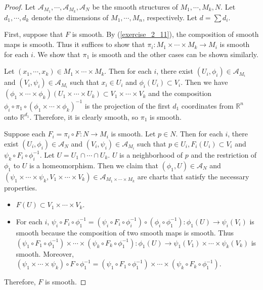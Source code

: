 \begin{proof}
  Let $\mathcal{A}_{M_1}, \cdots, \mathcal{A}_{M_k}, \mathcal{A}_N$ be the smooth structures of $M_1, \cdots, M_k, N$.
  Let $d_1, \cdots, d_k$ denote the dimensions of $M_1, \cdots, M_n$, respectively.
  Let $d = \sum d_i$.

  First, suppose that $F$ is smooth.
  By (\ref{exercise_2_11}), the composition of smooth maps is smooth.
  Thus it suffices to show that $\pi_i: M_1 \times \cdots \times M_k \rightarrow M_i$ is smooth for each $i$.
  We show that $\pi_1$ is smooth and the other cases can be shown similarly.

  Let $(x_1, \cdots, x_k) \in M_1 \times \cdots \times M_k$.
  Then for each $i$, there exist $(U_i, \phi_i) \in \mathcal{A}_{M_i}$ and $(V_i, \psi_i) \in \mathcal{A}_{M_i}$ such that $x_i \in U_i$ and $\phi_i(U_i) \subset V_i$.
  Then we have $(\phi_1 \times \cdots \times \phi_k)(U_1 \times \cdots \times U_k) \subset V_1 \times \cdots \times V_k$ and the composition $\phi_i \circ \pi_1 \circ (\phi_1 \times \cdots \times \phi_k)^{-1}$ is the projection of the first $d_1$ coordinates from $\mathbb{R}^n$ onto $\mathbb{R}^{d_1}$.
  Therefore, it is clearly smooth, so $\pi_1$ is smooth.

  Suppose each $F_i = \pi_i \circ F: N \rightarrow M_i$ is smooth.
  Let $p \in N$.
  Then for each $i$, there exist $(U_i, \phi_i) \in \mathcal{A}_N$ and $(V_i, \psi_i) \in \mathcal{A}_{M_i}$ such that $p \in U_i, F_i(U_i) \subset V_i$ and $\psi_k \circ F_i \circ \phi_i^{-1}$.
  Let $U = U_1 \cap \cdots \cap U_k$.
  $U$ is a neighborhood of $p$ and the restriction of $\phi_1$ to $U$ is a homeomorphism.
  Then we claim that $(\phi_1, U) \in \mathcal{A}_N$ and $(\psi_1 \times \cdots \times \psi_k, V_1 \times \cdots \times V_k) \in \mathcal{A}_{M_1 \times \cdots \times M_k}$ are charts that satisfy the necessary properties.
  \begin{itemize}
    \item
      $F(U) \subset V_1 \times \cdots \times V_k$.
    \item
      For each $i$, $\psi_i \circ F_i \circ \phi_1^{-1} = (\psi_i \circ F_i \circ \phi_i^{-1}) \circ (\phi_i \circ \phi_1^{-1}): \phi_1(U) \rightarrow \psi_i(V_i)$ is smooth because the composition of two smooth maps is smooth.
      Thus $(\psi_1 \circ F_1 \circ \phi_1^{-1}) \times \cdots \times (\psi_k \circ F_k \circ \phi_1^{-1}): \phi_1(U) \rightarrow \psi_1(V_1) \times \cdots \times \psi_k(V_k)$ is smooth.
      Moreover, $(\psi_1 \times \cdots \times \psi_k) \circ F \circ \phi_1^{-1} = (\psi_1 \circ F_1 \circ \phi_1^{-1}) \times \cdots \times (\psi_k \circ F_k \circ \phi_1^{-1})$.
  \end{itemize}

  Therefore, $F$ is smooth.
\end{proof}

